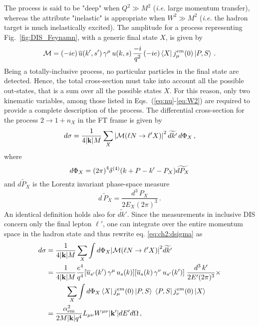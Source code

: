 The process  is said to be "deep" when $Q^2 \gg M^2$ (\textit{i.e.} large momentum transfer), whereas the attribute "inelastic" is appropriate when $W^2 \gg M^2$ (\textit{i.e.} the hadron target is much inelastically excited). The amplitude for a process representing Fig.~\ref{fig:DIS_Feynamn}, with a generic final state $X$, is given by
\begin{equation}
    \mathcal{M} = (-i e) \, \overline{u}(k',s') \, \gamma^{\mu}\, u(k,s) \, \frac{-i}{q^2} \, (-i e)\bra{X} j_{\mu}^{em} \qty(0) \ket{P,S} \,.
    \label{eq:ch2:amplitude}
\end{equation}
Being a totally-inclusive process, no particular particles in the final state are detected. Hence, the total cross-section must take into account all the possible out-states, that is a sum over all the possible states $X$. For this reason, only two kinematic variables, among those listed in Eqs.~(\ref{eq:nu}-\ref{eq:W2}) are required to provide a complete description of the process. The differential cross-section for the process $2 \rightarrow 1 + n_X$ in the FT frame is given by 
\begin{equation}
    d\sigma = \frac{1}{4 \qty|\vb{k}| M} \sum_{X} \qty| \mathcal{M} \qty( \ell N \rightarrow \ell'X ) |^2 \, \widetilde{d k'} \,  d\Phi_X \, ,
    \label{eq:ch2:dsigma}
\end{equation}
where
\begin{equation}
        d \Phi_X = \qty(2\pi)^4 \delta^{(4)} \qty( k + P - k' - P_X ) \widetilde{dP_X}  
\end{equation}
and $\widetilde{dP_X}$ is the Lorentz invariant phase-space measure
\begin{equation}
    \widetilde{d\, P_X} = \frac{d^3 \, P_X}{2 E_X (2\pi)^3} \,.
\end{equation}
An identical definition holds also for $\widetilde{d k'}$.  Since the measurements in inclusive DIS concern only the final lepton $\ell'$, one can integrate over the entire momentum space in the hadron state and thus rewrite eq. \eqref{eq:ch2:dsigma} as
\begin{equation}
    \begin{split}
        d\sigma &= \frac{1}{4 \qty|\vb{k}| M} \sum_{X} \int d\Phi_X \qty| \mathcal{M} \qty( \ell N \rightarrow \ell'X ) |^2 \widetilde{d k'}  \\
        & = \frac{1}{4 \qty|\vb{k}| M}  \frac{e^4}{q^4} \qty[ \overline{u}_{s'}(k') \, \gamma^{\mu}\, u_s(k)] \qty[\overline{u}_{s}(k) \,\gamma^{\nu}\, u_{s'}(k') ] \; \frac{d^3 \, k'}{2 E' (2\pi)^3} \times \\
        & \hspace{10mm} \sum_{X} \int d\Phi_X  \bra{X} j_{\mu}^{em} \qty(0) \ket{P,S} \; \bra{P,S} j_{\nu}^{em} \qty(0) \ket{X}  \\
        & = \frac{\alpha_{\textrm{em}}^2}{2 M \qty|\vb{k}| q^4} L_{\mu\nu} W^{\mu\nu} \qty|\vb{k}'| dE' d\Omega \,,
        \label{eq:ch2:dsigma2}
    \end{split}
\end{equation}
